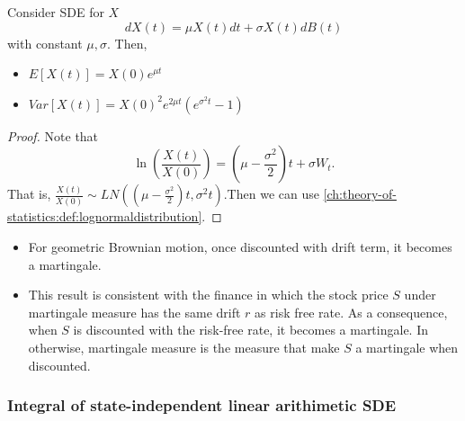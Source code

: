 \begin{refsection}
\begin{corollary}
	Consider SDE for $X$
	$$dX(t) = \mu X(t)dt + \sigma X(t)dB(t)$$
	with constant $\mu,\sigma$.	
	Then, 
	\begin{itemize}
		\item $E[X(t)] = X(0)e^{\mu t}$
		\item $Var[X(t)] = X(0)^2e^{2\mu t}(e^{\sigma^2t}-1) $
	\end{itemize}
\end{corollary}
\begin{proof}
	Note that $$\ln(\frac{X(t)}{X(0)}) = (\mu - \frac{\sigma^2}{2})t + \sigma W_t.$$
	That is, $\frac{X(t)}{X(0)}\sim LN((\mu - \frac{\sigma^2}{2})t, \sigma^2t)$.Then we can use
	\autoref{ch:theory-of-statistics:def:lognormaldistribution}.
\end{proof}

\begin{remark}\hfill
	\begin{itemize}
		\item For geometric Brownian motion, once discounted with drift term, it becomes a martingale.
		\item This result is consistent with the finance in which the stock price $S$ under martingale measure has the same drift $r$ as risk free rate. As a consequence, when $S$ is discounted with the risk-free rate, it becomes a martingale. In otherwise, martingale measure is the measure that make $S$ a martingale when discounted.   
	\end{itemize}
\end{remark}

\subsubsection{Integral of state-independent linear arithimetic SDE}


\end{refsection}
